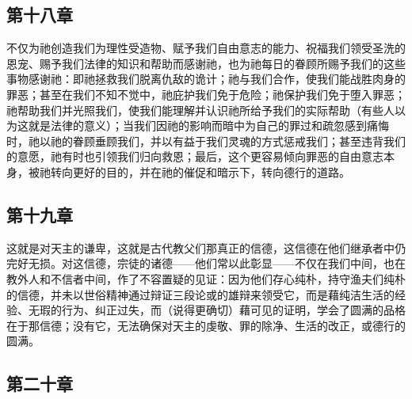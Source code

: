 
\subsection{第十八章}

\par

不仅为祂创造我们为理性受造物、赋予我们自由意志的能力、祝福我们领受圣洗的恩宠、赐予我们法律的知识和帮助而感谢祂，也为祂每日的眷顾所赐予我们的这些事物感谢祂：即祂拯救我们脱离仇敌的诡计；祂与我们合作，使我们能战胜肉身的罪恶；甚至在我们不知不觉中，祂庇护我们免于危险；祂保护我们免于堕入罪恶；祂帮助我们并光照我们，使我们能理解并认识祂所给予我们的实际帮助（有些人以为这就是法律的意义）；当我们因祂的影响而暗中为自己的罪过和疏忽感到痛悔时，祂以祂的眷顾垂顾我们，并以有益于我们灵魂的方式惩戒我们；甚至违背我们的意愿，祂有时也引领我们归向救恩；最后，这个更容易倾向罪恶的自由意志本身，被祂转向更好的目的，并在祂的催促和暗示下，转向德行的道路。\par


\subsection{第十九章}

\par

这就是对天主的谦卑，这就是古代教父们那真正的信德，这信德在他们继承者中仍完好无损。对这信德，宗徒的诸德——他们常以此彰显——不仅在我们中间，也在教外人和不信者中间，作了不容置疑的见证：因为他们存心纯朴，持守渔夫们纯朴的信德，并未以世俗精神通过辩证三段论或的雄辩来领受它，而是藉纯洁生活的经验、无瑕的行为、纠正过失，而（说得更确切）藉可见的证明，学会了圆满的品格在于那信德；没有它，无法确保对天主的虔敬、罪的除净、生活的改正，或德行的圆满。\par


\subsection{第二十章}

\par

